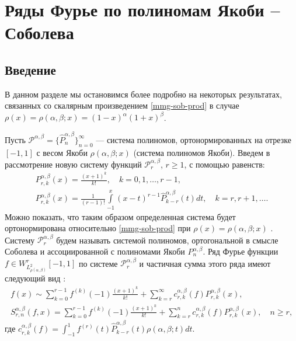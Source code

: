 ﻿\chapter{Ряды Фурье по полиномам Якоби -- Соболева}\label{MMG}
\section{Введение}
В данном разделе мы остановимся более подробно на некоторых результатах, связанных со скалярным произведением \eqref{mmg-sob-prod} в случае $\rho(x)=\rho(\alpha,\beta; x)=(1-x)^\alpha(1+x)^\beta$.

Пусть $\mathcal{P}^{\alpha,\beta}=\{ \hat{P}_n^{\alpha,\beta} \}_{n=0}^\infty$ --- система полиномов, ортонормированных на отрезке $[-1,1]$ с весом Якоби $\rho(\alpha,\beta; x)$ (система полиномов Якоби). Введем в рассмотрение новую систему функций $\mathcal{P}^{\alpha,\beta}_r$, $r \ge 1$, с помощью равенств:
\begin{gather}
	\label{mmg-sob-def1}
	P_{r,k}^{\alpha,\beta}(x) =\frac{(x+1)^k}{k!}, \quad k=0,1,\ldots, r-1,\\
	\label{mmg-sob-def2}
	P_{r,k}^{\alpha,\beta}(x) =\frac{1}{(r-1)!}\int\limits_{-1}^x(x-t)^{r-1}\hat{P}_{k-r}^{\alpha,\beta}(t)dt, \quad k=r,r+1,\ldots.
\end{gather}
Можно показать, что таким образом определенная система будет ортонормирована относительно \eqref{mmg-sob-prod} при $\rho(x)=\rho(\alpha,\beta; x)$ \cite[с.~231]{mmg-Shii-izvran2018}. Систему $\mathcal{P}_r^{\alpha,\beta}$ будем называть системой полиномов, ортогональной в смысле Соболева и ассоциированной с полиномами Якоби $P_n^{\alpha,\beta}$.
Ряд Фурье функции $f \in W^r_{L^2_{\rho(\alpha,\beta)}}[-1,1]$ по системе $\mathcal{P}_r^{\alpha,\beta}$ и частичная сумма этого ряда имеют следующий вид \cite[с.~227]{mmg-Shii-izvran2018}:
\begin{gather}
	\label{mmg-sob-fourier-series}
	f(x) \sim \sum_{k=0}^{r-1} f^{(k)}(-1)\frac{(x+1)^k}{k!}+ \sum_{k=r}^\infty c^{\alpha,\beta}_{r,k}(f) P_{r,k}^{\alpha,\beta}(x),\\
	\label{mmg-sob-part-sum}
	S^{\alpha,\beta}_{r,n}(f,x) = \sum_{k=0}^{r-1} f^{(k)}(-1)\frac{(x+1)^k}{k!}+ \sum_{k=r}^n c^{\alpha,\beta}_{r,k}(f) P_{r,k}^{\alpha,\beta}(x), \quad n \ge r,
\end{gather}
где $c^{\alpha,\beta}_{r,k}(f)=\int_{-1}^1 f^{(r)}(t)\hat{P}_{k-r}^{\alpha,\beta}(t)\rho(\alpha,\beta; t)dt$.

